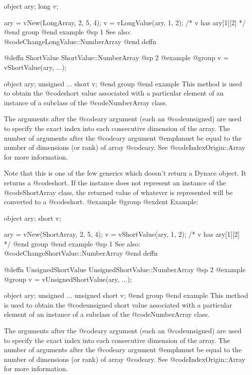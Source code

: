 object  ary;
long    v;

ary = vNew(LongArray, 2, 5, 4);
v = vLongValue(ary, 1, 2);
/*  v has ary[1][2]  */
@end group
@end example
@sp 1
See also:  @code{ChangeLongValue::NumberArray}
@end deffn









@deffn {ShortValue} ShortValue::NumberArray
@sp 2
@example
@group
v = vShortValue(ary, ...);

object    ary;
unsigned  ...
short     v;
@end group
@end example
This method is used to obtain the @code{short} value associated with a
particular element of an instance of a subclass of the
@code{NumberArray} class.

The arguments after the @code{ary} argument (each an @code{unsigned})
are used to specify the exact index into each consecutive dimension of
the array.  The number of arguments after the @code{ary} argument
@emph{must} be equal to the number of dimensions (or rank) of array
@code{ary}.  See @code{IndexOrigin::Array} for more information.

Note that this is one of the few generics which doesn't return a Dynace
object.  It returns a @code{short}.  If the instance does not represent
an instance of the @code{ShortArray} class, the returned value of
whatever is represented will be converted to a @code{short}.
@example
@group
@exdent Example:

object  ary;
short   v;

ary = vNew(ShortArray, 2, 5, 4);
v = vShortValue(ary, 1, 2);
/*  v has ary[1][2]  */
@end group
@end example
@sp 1
See also:  @code{ChangeShortValue::NumberArray}
@end deffn






@deffn {UnsignedShortValue} UnsignedShortValue::NumberArray
@sp 2
@example
@group
v = vUnsignedShortValue(ary, ...);

object    ary;
unsigned  ...
unsigned short     v;
@end group
@end example
This method is used to obtain the @code{unsigned short} value associated with a
particular element of an instance of a subclass of the
@code{NumberArray} class.

The arguments after the @code{ary} argument (each an @code{unsigned})
are used to specify the exact index into each consecutive dimension of
the array.  The number of arguments after the @code{ary} argument
@emph{must} be equal to the number of dimensions (or rank) of array
@code{ary}.  See @code{IndexOrigin::Array} for more information.

